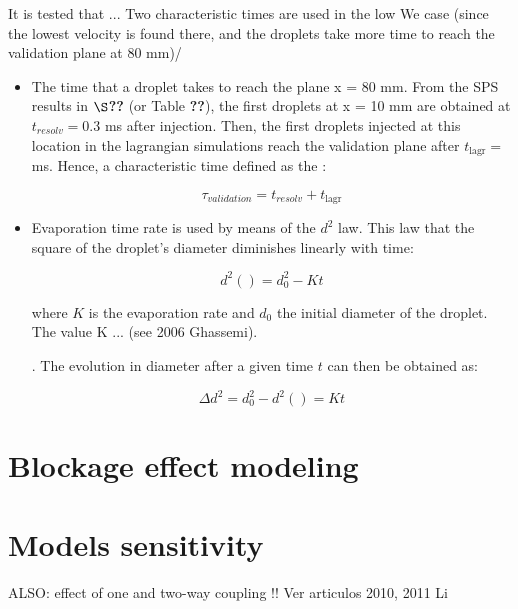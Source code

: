It is tested that ... Two characteristic times are used in the low We case (since the lowest velocity is found there, and the droplets take more time to reach the validation plane at 80 mm)/

\begin{itemize}

	\item The time that a droplet takes to reach the plane x = 80 mm. From the SPS results in $\S$\textbf{??} (or Table \textbf{??}), the first droplets at x = 10 mm are obtained at $t_{resolv} = 0.3$ ms after injection. Then, the first droplets injected at this location in the lagrangian simulations reach the validation plane after $t_\mathrm{lagr} = $ ms. Hence, a characteristic time defined as the :
	
	\begin{equation}
	\tau_{validation} = t_{resolv}  + t_\mathrm{lagr}
	\end{equation}
	
	\item Evaporation time rate is used by means of the $d^2$ law. This law that the square of the droplet's diameter diminishes linearly with time:
	
	\begin{equation}
	\label{eq:d2_law}
	d^2 \left( \right) = d_0^2 - K t
	\end{equation}
	
	
	where $K$ is the evaporation rate and $d_0$ the initial diameter of the droplet. The value K ... (see 2006 Ghassemi).
	
	
	. The evolution in diameter after a given time $t$ can then be obtained as:
	
	\begin{equation}
	\Delta d^2 = d_0^2 - d^2 \left( \right) = K t
	\end{equation}
	

\end{itemize}

\section{Blockage effect modeling}



\section{Models sensitivity}

ALSO: effect of one and two-way coupling !! Ver articulos 2010, 2011 Li 

